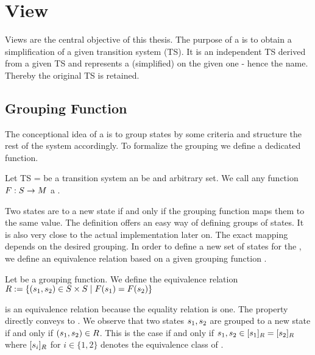 \documentclass[preview]{standalone}
\begin{document}
\section{View}
Views are the central objective of this thesis. The purpose of a \viewN is to obtain a simplification of a given transition system (TS).  It is an independent TS derived from a given TS and represents a (simplified) \viewN on the given one - hence the name. Thereby the original TS is retained. 

\subsection{Grouping Function}



The conceptional idea of a \viewN is to group states by some criteria and structure the rest of the system accordingly. To formalize the grouping we define a dedicated function.

\begin{definition}
	Let TS = \transitionsystem be a transition system an \arbset be and arbitrary set. We call any function $F : {S} \to {\ensuremath{{M}}}$ a \emph{\grpfctN}.
	
	\label{def:grpfct}
\end{definition}


Two states are  to a new state if and only if the grouping function maps them to the same value. The definition offers an easy way of defining groups of states. It is also very close to the actual implementation later on. The exact mapping depends on the desired grouping. In order to define a new set of states for the \viewN, we define an equivalence relation \eqrelview based on a given grouping function \grpfct.

\begin{definition}
	Let \grpfct be a grouping function. We define the equivalence relation ${R} :=\{ ({s}_1, {s}_2) \in {S} \times {S} \mid {F}({s}_1) = {F}({s}_2)\}$
	
	\label{def:eqrelview}
\end{definition}

\eqrelview is an equivalence relation because the equality relation is one. The property directly conveys to \eqrelview. We observe that two states ${s}_1, {s}_2$ are grouped to a new state if and only if $({s}_1, {s}_2) \in {R}$. This is the case if and only if ${s}_1, {s}_2 \in {\ensuremath{{[{s}_1]_{{R}}}}} = {{[{s}_2]_{{R}}}}$ where ${{[{s}_i]_{{R}}}}$ for $i \in \{1,2\}$ denotes the equivalence class of \eqrelview.
\end{document}
